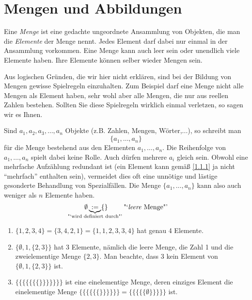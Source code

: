 \documentclass[../../main.tex]{subfiles}
\begin{document}
\section{Mengen und Abbildungen}

\begin{psdf}\label{1.1.1}
Eine \emph{Menge} ist eine gedachte ungeordnete Ansammlung von Objekten, die man die \emph{Elemente} der Menge nennt. Jedes Element darf dabei nur einmal in der Ansammlung vorkommen. Eine Menge kann auch leer sein oder unendlich viele Elemente haben. Ihre Elemente können selber wieder Mengen sein.
\end{psdf}

\begin{warning}\label{1.1.2}
Aus logischen Gründen, die wir hier nicht erklären, sind bei der Bildung von Mengen gewisse Spielregeln einzuhalten. Zum Beispiel darf eine Menge nicht alle Mengen als Element haben, sehr wohl aber alle Mengen, die nur aus reellen Zahlen bestehen.
Sollten Sie diese Spielregeln wirklich einmal verletzen, so sagen wir es Ihnen.
\end{warning}

\begin{nt}\label{1.1.3}
Sind $a_1,a_2,a_3,\ldots,a_n$ Objekte (z.B. Zahlen, Mengen, Wörter,...), so schreibt man
\[\{a_1,\ldots,a_n\}\]
für die Menge bestehend aus den Elementen $a_1,\ldots,a_n$. Die Reihenfolge von $a_1,\ldots,a_n$ spielt dabei keine Rolle. Auch dürfen mehrere $a_i$ gleich sein. Obwohl eine mehrfache Aufzählung redundant ist (ein Element kann gemäß \ref{1.1.1} ja nicht "`mehrfach"' enthalten sein), vermeidet dies oft eine unnötige und lästige gesonderte Behandlung von Spezialfällen. Die Menge $\{a_1,\ldots,a_n\}$ kann also auch weniger als $n$ Elemente haben.
$$\emptyset \underbrace{:=}_{\mathclap{\text{"`wird definiert durch"'}}}\{\}\qquad\text{ "`\emph{leere} Menge"'}$$
\end{nt}

\begin{bsp}\label{1.1.4}
\begin{enumerate}[\normalfont(a)]
\item $\{1,2,3,4\}=\{3,4,2,1\}=\{1,1,2,3,3,4\}$ hat genau 4 Elemente.
\item $\{\emptyset, 1,\{2,3\}\}$ hat 3 Elemente, nämlich die leere Menge, die Zahl 1 und die zweielementige Menge $\{2,3\}$. Man beachte, dass 3 kein Element von $\{\emptyset, 1,\{2,3\}\}$ ist.
\item $\{\{\{\{\{\{\{\}\}\}\}\}\}\}$ ist eine einelementige Menge, deren einziges Element die einelementige Menge $\{\{\{\{\{\{\}\}\}\}\}\}=\{\{\{\{\{\emptyset\}\}\}\}\}$ ist.
\end{enumerate}
\end{bsp}
\end{document}

